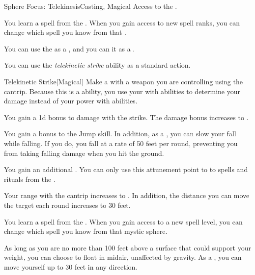     \begin{feat}{Sphere Focus: Telekinesis}{Casting, Magical}
        \featpre Access to the  .

         You learn a spell from the  .
        When you gain access to new spell ranks, you can change which spell you know from that .

         You can use the   as a , and you can  it as a .

         You can use the \textit{telekinetic strike} ability as a standard action.
        \begin{freeability}{Telekinetic Strike}[Magical]
            Make a  with a weapon you are controlling using the  cantrip.
            Because this is a  ability, you use your  with  abilities to determine your damage instead of your power with  abilities.

            \rankline
             You gain a \plus1d bonus to damage with the strike.
             The damage bonus increases to .
        \end{freeability}

         You gain a  bonus to the Jump skill.
        In addition, as a , you can slow your fall while falling.
        If you do, you fall at a rate of 50 feet per round, preventing you from taking falling damage when you hit the ground.

         You gain an additional .
        You can only use this attunement point to  to spells and rituals from the  .

         Your range with the  cantrip increases to \rngmed.
        In addition, the distance you can move the target each round increases to 30 feet.

         You learn a spell from the  .
        When you gain access to a new spell level, you can change which spell you know from that mystic sphere.

         As long as you are no more than 100 feet above a surface that could support your weight, you can choose to float in midair, unaffected by gravity.
        As a , you can move yourself up to 30 feet in any direction.
    \end{feat}

